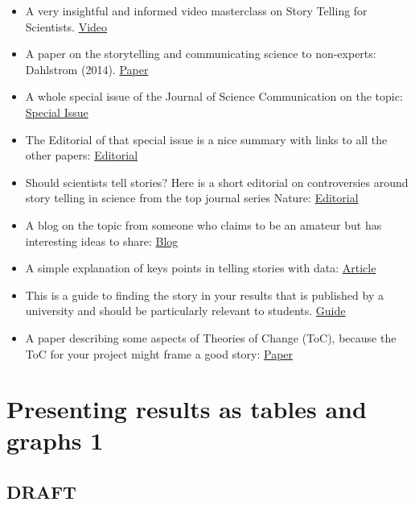 \documentclass[
]{book}
\begin{document}
\begin{itemize}
\item
  A very insightful and informed video masterclass on Story Telling for Scientists. \href{https://www.youtube.com/watch?v=6aVgf3T6p_8}{Video}
\item
  A paper on the storytelling and communicating science to non-experts: Dahlstrom (2014). \href{https://doi.org/10.1073/pnas.1320645111}{Paper}
\item
  A whole special issue of the Journal of Science Communication on the topic: \href{https://jcom.sissa.it/archive/18/05.}{Special Issue}
\item
  The Editorial of that special issue is a nice summary with links to all the other papers: \href{https://doi.org/10.22323/2.18050501}{Editorial}
\item
  Should scientists tell stories? Here is a short editorial on controversies around story telling in science from the top journal series Nature: \href{https://doi.org/10.1038/nmeth.2726}{Editorial}
\item
  A blog on the topic from someone who claims to be an amateur but has interesting ideas to share: \href{https://sokolj.com/Communicating-Data-Stories/}{Blog}
\item
  A simple explanation of keys points in telling stories with data: \href{https://www.dataversity.net/telling-stories-data-five-strategies-presenting-effective-data/\#}{Article}
\item
  This is a guide to finding the story in your results that is published by a university and should be particularly relevant to students. \href{https://www.monash.edu/rlo/graduate-research-writing/write-the-thesis/writing-the-thesis-chapters/reporting-and-discussing-your-findings\#present-your-findings}{Guide}
\item
  A paper describing some aspects of Theories of Change (ToC), because the ToC for your project might frame a good story: \href{https://evaluationcanada.ca/system/files/cjpe-entries/30-2-119_0.pdf}{Paper}
\end{itemize}

\hypertarget{tablegraph1}{%
\chapter{Presenting results as tables and graphs 1}\label{tablegraph1}}

\hypertarget{draft}{%
\section{DRAFT}\label{draft}}
\end{document}
